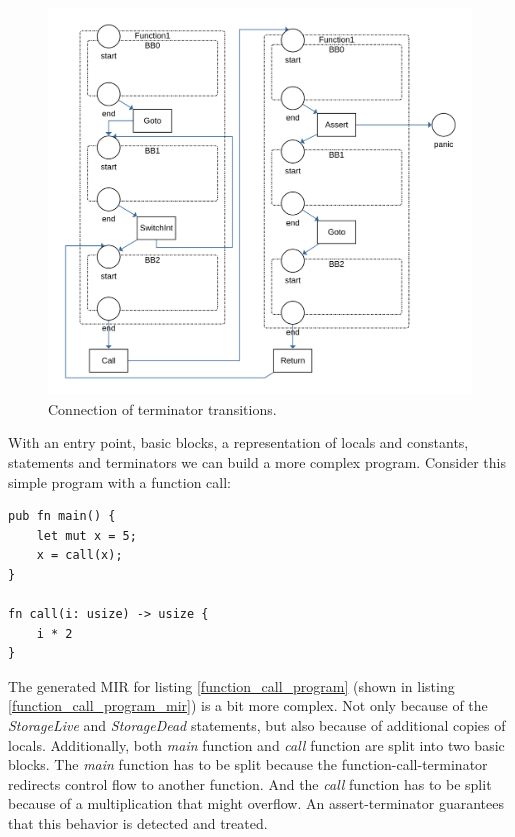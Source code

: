 \begin{figure}
    \centering
    \includegraphics[width=.8\textwidth]{../diagrams/TerminatorsNet.png}
    \caption{Connection of terminator transitions.}
    \label{terminators_net}
\end{figure}

With an entry point, basic blocks, a representation of locals and constants, statements and terminators we can build a more complex program.
Consider this simple program with a function call:
\begin{lstlisting}
pub fn main() {
    let mut x = 5;
    x = call(x);
}

fn call(i: usize) -> usize {
    i * 2
}
\end{lstlisting}
The generated MIR for listing \ref{function_call_program} (shown in listing \ref{function_call_program_mir}) is a bit more complex.
Not only because of the \textit{StorageLive} and \textit{StorageDead} statements, but also because of additional copies of locals.
Additionally, both \textit{main} function and \textit{call} function are split into two basic blocks.
The \textit{main} function has to be split because the function-call-terminator redirects control flow to another function.
And the \textit{call} function has to be split because of a multiplication that might overflow.
An assert-terminator guarantees that this behavior is detected and treated.

